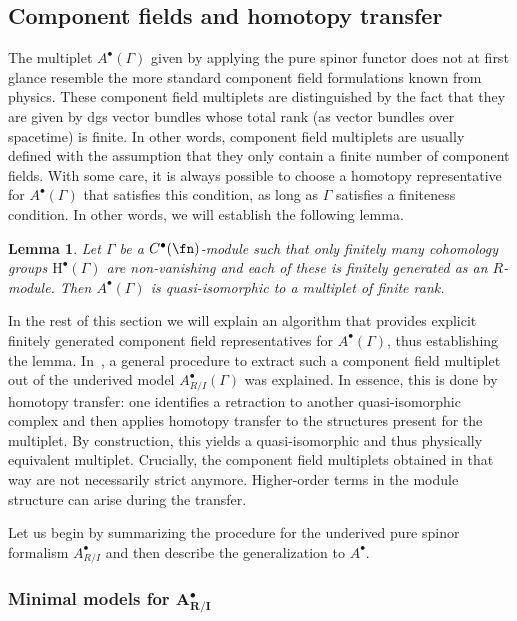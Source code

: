 \documentclass[10pt,a4paper]{amsart}
\numberwithin{equation}{section}
\newtheorem{lem}[thm]{Lemma}
\begin{document}
\subsection{Component fields and homotopy transfer} \label{sec: components}
The multiplet $A^\bullet(\Gamma)$ given by applying the pure spinor functor does not at first glance resemble the more standard component field formulations known from physics. These component field multiplets are distinguished by the fact that they are given by dgs vector bundles whose total rank (as vector bundles over spacetime) is finite. In other words, component field multiplets are usually defined with the assumption that they only contain a finite number of component fields. With some care, it is always possible to choose a homotopy representative for $A^\bullet(\Gamma)$ that satisfies this condition, as long as $\Gamma$ satisfies a finiteness condition. In other words, we will establish the following lemma.

\begin{lem} \label{fd_model_lemma}
	Let $\Gamma$ be a $C^\bullet(\fn)$-module such that only finitely many cohomology groups $\mathrm{H}^\bullet(\Gamma)$ are non-vanishing and each of these is finitely generated as an $R$-module. Then $A^\bullet(\Gamma)$ is quasi-isomorphic to a multiplet of finite rank.
\end{lem}

In the rest of this section we will explain an algorithm that provides explicit finitely generated component field representatives for $A^\bullet(\Gamma)$, thus establishing the lemma. In~\cite{perspectives}, a general procedure to extract such a component field multiplet out of the underived model $A^\bullet_{R/I}(\Gamma)$ was explained. In essence, this is done by homotopy transfer: one identifies a retraction to another quasi-isomorphic complex and then applies homotopy transfer to the structures present for the multiplet. By construction, this yields a quasi-isomorphic and thus physically equivalent multiplet. Crucially, the component field multiplets obtained in that way are not necessarily strict anymore. Higher-order terms in the module structure can arise during the transfer.

Let us begin by summarizing the procedure for the underived pure spinor formalism $A^\bullet_{R/I}$ and then describe the generalization to $A^\bullet$.

\subsubsection[Minimal models for A\^{}bullet\_\{R/I\}]{Minimal models for $\boldsymbol{A^\bullet_{R/I}}$}
\end{document}
